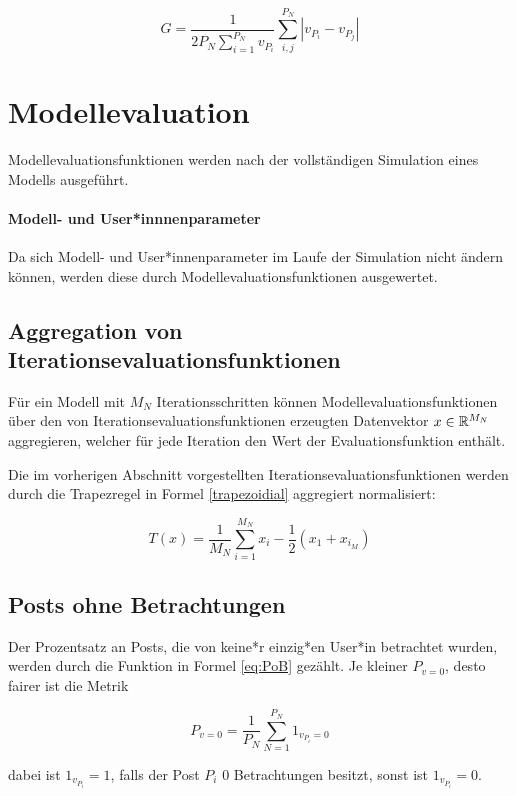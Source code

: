 \begin{equation}
G = \frac{1}{2P_N\sum_{i = 1}^{P_N}v_{P_i}}\sum_{i,j}^{P_N}|v_{P_i} - v_{P_j} |
\end{equation}


\section{Modellevaluation}

Modellevaluationsfunktionen werden nach der vollständigen Simulation eines Modells ausgeführt.

\paragraph{Modell- und User*innnenparameter} 

Da sich Modell- und User*innenparameter im Laufe der Simulation nicht ändern können, werden diese durch Modellevaluationsfunktionen ausgewertet.

\subsection{Aggregation von Iterationsevaluationsfunktionen}

Für ein Modell mit $M_N$ Iterationsschritten können 
Modellevaluationsfunktionen über den von Iterationsevaluationsfunktionen erzeugten Datenvektor $x \in \mathbb{R}^{M_N}$ aggregieren, welcher für jede Iteration den Wert der Evaluationsfunktion enthält.

Die im vorherigen Abschnitt vorgestellten Iterationsevaluationsfunktionen werden durch die Trapezregel in Formel \ref{trapezoidial} aggregiert normalisiert:

\begin{equation}
\label{trapezoidial}
T(x) = \frac{1}{M_N}\sum_{i = 1}^{M_N}x_i - \frac{1}{2}(x_1 + x_{i_M})
\end{equation}

\subsection{Posts ohne Betrachtungen}

Der Prozentsatz an Posts, die von keine*r einzig*en User*in betrachtet wurden, werden durch die Funktion in Formel \ref{eq:PoB} gezählt. Je kleiner $P_{v = 0}$, desto fairer ist die Metrik

\begin{equation}
\label{eq:PoB}
P_{v = 0} = \frac{1}{P_N}\sum_{N = 1}^{P_N} 1_{v_{P_i} = 0}
\end{equation}

dabei ist $1_{v_{P_i}} = 1$, falls der Post $P_i$ $0$ Betrachtungen besitzt, sonst ist $1_{v_{P_i}} = 0$.

 











